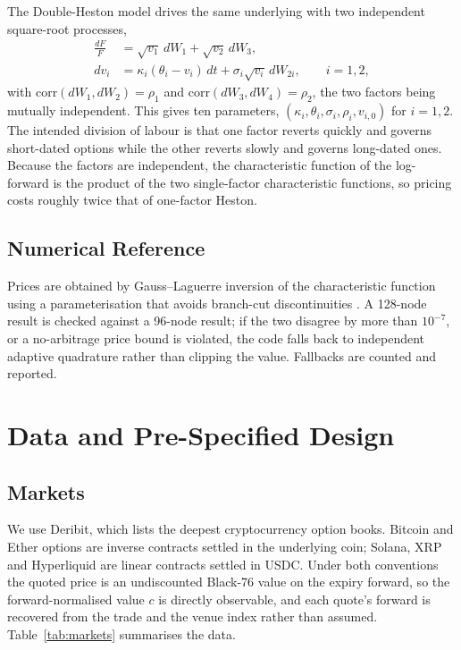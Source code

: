 \documentclass[runningheads]{llncs}
\begin{document}
The Double-Heston model drives the same underlying with two independent
square-root processes,
\begin{align}
\frac{dF}{F} &= \sqrt{v_1}\,dW_1 + \sqrt{v_2}\,dW_3, \\
dv_i &= \kappa_i(\theta_i - v_i)\,dt + \sigma_i\sqrt{v_i}\,dW_{2i},
\qquad i = 1,2,
\end{align}
with $\mathrm{corr}(dW_1,dW_2)=\rho_1$ and $\mathrm{corr}(dW_3,dW_4)=\rho_2$,
the two factors being mutually independent. This gives ten parameters,
$(\kappa_i,\theta_i,\sigma_i,\rho_i,v_{i,0})$ for $i=1,2$.
The intended division of labour is that one factor
reverts quickly and governs short-dated options while the other reverts slowly
and governs long-dated ones. Because the factors are independent, the
characteristic function of the log-forward is the product of the two
single-factor characteristic functions, so pricing costs roughly twice that of
one-factor Heston.

\subsection{Numerical Reference}

Prices are obtained by Gauss--Laguerre inversion of the characteristic function
using a parameterisation that avoids branch-cut discontinuities
\cite{lord2010}. A 128-node result is checked against a 96-node result; if the
two disagree by more than $10^{-7}$, or a no-arbitrage price bound is violated,
the code falls back to independent adaptive quadrature rather than clipping the
value. Fallbacks are counted and reported.

\section{Data and Pre-Specified Design}

\subsection{Markets}

We use Deribit, which lists the deepest cryptocurrency option books. Bitcoin
and Ether options are inverse contracts settled in the underlying coin; Solana,
XRP and Hyperliquid are linear contracts settled in USDC. Under both
conventions the quoted price is an undiscounted Black-76 value on the expiry
forward, so the forward-normalised value $c$ is directly observable, and each
quote's forward is recovered from the trade and the venue index rather than
assumed. Table~\ref{tab:markets} summarises the data.
\end{document}
